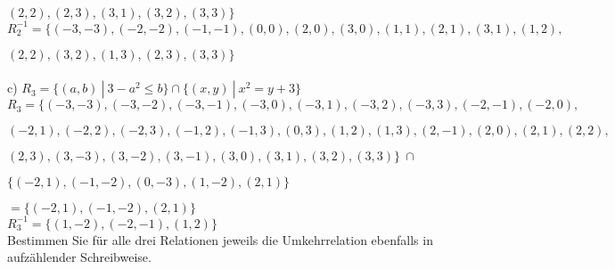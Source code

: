\hspace{1.3cm}$(2,2), (2,3), (3,1), (3,2), (3,3)\}$\\

$R_{2}^{-1} = \{(-3,-3), (-2,-2), (-1,-1), (0,0), (2,0), (3,0), (1,1), (2,1), (3,1), (1,2),$

\hspace{1.5cm}$(2,2), (3,2), (1,3), (2,3), (3,3)\}$\\~\\

c) $R_3 = \{(a,b) \ | \  3 - a^2 \leq b\} \cap \{(x,y) \ | \ x^2 = y + 3 \}$\\

$R_3 = \{(-3,-3), (-3,-2), (-3,-1), (-3,0), (-3,1), (-3,2), (-3,3), (-2,-1), (-2,0),$

\hspace{1.3cm}$(-2,1), (-2,2), (-2,3), (-1,2), (-1,3), (0,3), (1,2), (1,3), (2,-1), (2,0), (2,1), (2,2),$

\hspace{1.3cm}$(2,3), (3,-3), (3,-2), (3,-1), (3,0), (3,1), (3,2), (3,3)\} \ \cap$

\hspace{1.05cm}$\{(-2,1), (-1,-2), (0,-3), (1,-2), (2,1)\}$

\hspace{0.63cm}$ = \{(-2,1), (-1,-2), (2,1)\}$\\

$R_{3}^{-1} = \{(1,-2), (-2,-1), (1,2)\}$\\

Bestimmen Sie für alle drei Relationen jeweils die Umkehrrelation ebenfalls in aufzählender Schreibweise.\\